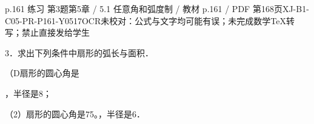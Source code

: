 \begin{bankitem}{p.161 练习 第3题}{第5章 / 5.1 任意角和弧度制 / 教材 p.161 / PDF 第168页}{XJ-B1-C05-PR-P161-Y0517}{OCR未校对：公式与文字均可能有误；未完成数学TeX转写；禁止直接发给学生}
\begin{ocrdraft}
\par
3．求出下列条件中扇形的弧长与面积．
\par
（D扇形的圆心角是
\par
，半径是8；
\par
（2）扇形的圆心角是75。，半径是6．
\end{ocrdraft}
\end{bankitem}
